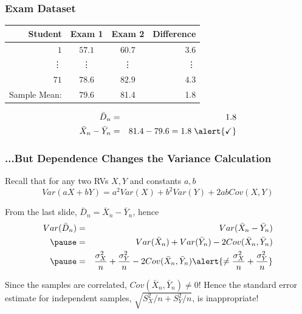 \begin{frame}
\frametitle{Exam Dataset}
%
\begin{table}[!tbp]
\begin{center}
\begin{tabular}{rccr}
\hline\hline
\multicolumn{1}{r}{Student}&\multicolumn{1}{c}{Exam 1}&\multicolumn{1}{c}{Exam 2}&\multicolumn{1}{r}{Difference}\tabularnewline
\hline
$ 1$&$57.1$&$60.7$&$  3.6$\tabularnewline
\vdots&\vdots&\vdots&\vdots\\
$71$&$78.6$&$82.9$&$  4.3$\tabularnewline
\hline
Sample Mean: & 79.6 & 81.4  &1.8\\
\hline
\end{tabular}
\end{center}
\end{table}


\begin{eqnarray*}
	\bar{D}_n &=& 1.8\\ 
	\bar{X}_n - \bar{Y}_n &=&  81.4 - 79.6 =   1.8  \;\alert{\checkmark}
\end{eqnarray*}

\end{frame}


\begin{frame}
\frametitle{...But Dependence Changes the Variance Calculation}
\small
Recall that for any two RVs $X,Y$ and constants $a,b$
$$Var(aX + bY) = a^2 Var(X) + b^2Var(Y) + 2ab Cov(X,Y)$$

\pause
From the last slide, $\bar{D}_n = \bar{X}_n - \bar{Y}_n$, hence
\begin{eqnarray*}
Var(\bar{D}_n) &=& Var(\bar{X}_n - \bar{Y}_n)\\ \pause
 &=& Var(\bar{X}_n) + Var(\bar{Y}_n) - 2Cov(\bar{X}_n, \bar{Y}_n)\\ \pause
	&=& \frac{\sigma_X^2}{n} + \frac{\sigma_Y^2}{n} - 2Cov(\bar{X}_n, \bar{Y}_n) \alert{\neq \frac{\sigma_X^2}{n} + \frac{\sigma_Y^2}{n}}\\
\end{eqnarray*}


\alert{Since the samples are correlated, $Cov(\bar{X}_n, \bar{Y}_n)\neq 0$! Hence the standard error estimate for independent samples, $\sqrt{S^2_X/n + S^2_Y/n}$, is  inappropriate!}


\end{frame}


